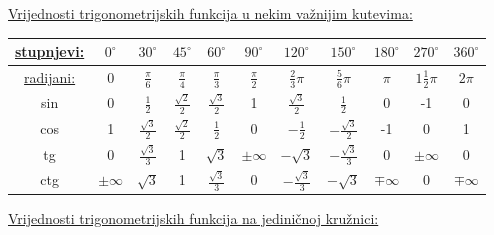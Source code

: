 \documentclass[10pt,oneside,a4paper]{report}
\begin{document}
\vspace{4mm}
\noindent
{\large \textsf{\underline{Vrijednosti trigonometrijskih funkcija u nekim va\v{z}nijim kutevima:}}}
\begin{center}
\renewcommand{\arraystretch}{1.6}
\begin{tabular}{c||c|c|c|c|c|c|c|c|c|c}
\scriptsize{\underline{stupnjevi:}} & $0^\circ$ & $30^\circ$ & $45^\circ$ & $60^\circ$ & $90^\circ$ & $120^\circ$ &  $150^\circ$ & $180^\circ$ & $270^\circ$ & $360^\circ$ \\
\hline
	\scriptsize{\underline{radijani:}} & 
	$0$ & $\displaystyle \frac{\pi}6$ &
	$\displaystyle \frac \pi 4$&
	$\displaystyle \frac \pi 3$&
	$\displaystyle \frac\pi 2$&
	$\displaystyle \frac 23 \pi$&
	$\displaystyle \frac 56 \pi$&
	$\displaystyle \pi $&
	$\displaystyle 1 \frac 12 \pi $&
	$\displaystyle 2\pi $\\
\hline
\hline
	sin &
	0 &
	$\displaystyle \frac 12$ &
	$\displaystyle \frac{\sqrt{2}}2$ &
	$\displaystyle \frac{\sqrt 3}2$&
	1 &
	$\displaystyle \frac{\sqrt 3}2$&
	$\displaystyle \frac 12$&
	0 &
	-1 &
	0 \\
\hline	
	cos &
	1 &
	$\displaystyle \frac {\sqrt 3}2$ &
	$\displaystyle \frac{\sqrt{2}}2$ &
	$\displaystyle \frac 12$&
	0 &
	$\displaystyle -\frac 12$&
	$\displaystyle -\frac {\sqrt 3}2$&
	-1 &
	0 &
	1 \\
\hline	
	tg &
	0 &
	$\displaystyle \frac {\sqrt 3}3$ &
	1 &
	$\displaystyle \sqrt 3$&
	$\displaystyle \pm \infty$ &
	$\displaystyle -\sqrt 3$ &
	$\displaystyle -\frac{\sqrt{3}}3$ &
	0 &
	$\displaystyle \pm \infty$ &
	$\displaystyle 0$ \\
\hline
	ctg &
	$\displaystyle \pm \infty$ &
	$\displaystyle \sqrt 3$ &
	1 &
	$\displaystyle \frac{\sqrt 3}3$&
	0 &
	$\displaystyle -\frac{\sqrt 3}3$&
	$\displaystyle -\sqrt 3 $&
	$\displaystyle \mp \infty$ &
	0 &
	$\displaystyle \mp \infty$ \\
\end{tabular}
\end{center}

\vspace{2mm}
\noindent
{\large \textsf{\underline{Vrijednosti trigonometrijskih funkcija na jedini\v{c}noj kru\v{z}nici:}}}
\end{document}

